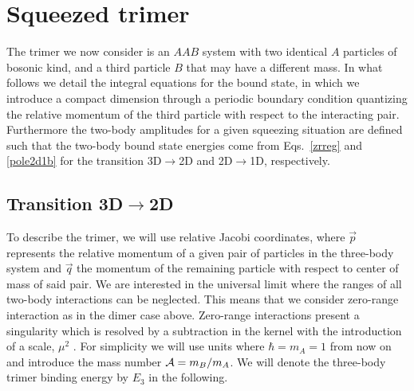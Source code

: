 \documentclass[twocolumn,showpacs,aps,prl,10pt]{revtex4}
\begin{document}
\section{Squeezed trimer}
The trimer we now consider is an $AAB$ system with two identical $A$ particles 
of bosonic kind, and a third particle $B$ that may have a different mass.
In what follows we detail the integral equations for the bound state, 
in which we introduce a compact dimension through a periodic boundary condition quantizing the 
relative momentum of the third particle with respect to the interacting pair. Furthermore 
 the two-body amplitudes for a given squeezing situation are defined such that the two-body bound 
state energies come from Eqs.~\eqref{zrreg} and \eqref{pole2d1b} for the transition 3D$\to$2D and
2D$\to$1D, respectively. 

\subsection{Transition 3D$\rightarrow$2D}
To describe the trimer, 
we will use relative Jacobi coordinates, where 
$\vec p$ represents the relative momentum of a given pair of 
particles in the three-body system and $\vec q$ the momentum 
of the remaining particle with respect to center of mass of said pair. We are 
interested in the universal limit 
where the ranges of all two-body interactions can be neglected. This means
that we consider zero-range interaction as in the dimer case above. 
Zero-range interactions present 
a singularity which is resolved by a subtraction in the kernel with 
the introduction of a scale, $\mu^2$ \cite{adhikari}. For simplicity we will use units 
where $\hbar=m_A=1$ from now on and  introduce the mass number ${\cal A}=m_B/m_A$. 
We will denote the three-body trimer binding energy by $E_3$ in the following. 
\end{document}
